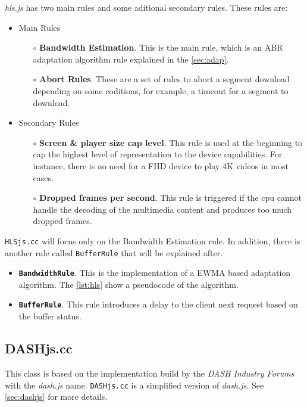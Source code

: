 \textit{hls.js} has two main rules and some aditional secondary rules. These rules are:
\begin{itemize}[noitemsep, topsep=0pt]
  \item Main Rules
  \begin{itemize}[noitemsep, topsep=0pt]
    \item[$\circ$] \textbf{Bandwidth Estimation}. This is the main rule, which is an ABR adaptation
    algorithm rule explained in the \autoref{sec:adap}.
    \item[$\circ$] \textbf{Abort Rules}. These are a set of rules to abort a segment download depending on
    some coditions, for example, a timeout for a segment to download.
  \end{itemize}
  \item Secondary Rules
  \begin{itemize}[noitemsep, topsep=0pt]
    \item[$\circ$] \textbf{Screen \& player size cap level}. This rule is used at the beginning to cap the highest
    level of representation to the device capabilities. For instance, there is no need for a FHD
    device to play 4K videos in most cases.
    \item[$\circ$] \textbf{Dropped frames per second}. This rule is triggered if the cpu cannot handle the 
    decoding of the multimedia content and produces too much dropped frames.
  \end{itemize}
\end{itemize}

\texttt{HLSjs.cc} will focus only on the Bandwidth Estimation rule. In addition, there is another 
rule called \texttt{BufferRule} that will be explained after.

\begin{itemize}
  \item \textbf{\texttt{BandwidthRule}}. This is the implementation of a EWMA based adaptation
  algorithm. The \autoref{lst:hls} show a pseudocode of the algorithm.
  \item \textbf{\texttt{BufferRule}}. This rule introduces a delay to the client
  next request based on the buffer status.
\end{itemize}

\subsection{DASHjs.cc}
This class is based on the implementation build by the \textit{DASH Industry Forums} with the \textit{dash.js}
name. \texttt{DASHjs.cc} is a simplified version of \textit{dash.js}. See \autoref{sec:dashjs} for more details.

